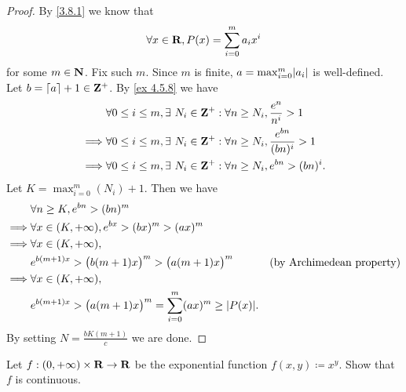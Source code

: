 \begin{proof}
  By \cref{3.8.1} we know that
  \[
    \forall x \in \mathbf{R}, P(x) = \sum_{i = 0}^m a_i x^i
  \]
  for some \(m \in \mathbf{N}\).
  Fix such \(m\).
  Since \(m\) is finite, \(a = \max_{i = 0}^m \abs{a_i}\) is well-defined.
  Let \(b = \left\lceil a\right\rceil + 1 \in \mathbf{Z}^+\).
  By \cref{ex 4.5.8} we have
  \begin{align*}
             & \forall 0 \leq i \leq m, \exists\ N_i \in \mathbf{Z}^+ : \forall n \geq N_i, \frac{e^n}{n^i} > 1       \\
    \implies & \forall 0 \leq i \leq m, \exists\ N_i \in \mathbf{Z}^+ : \forall n \geq N_i, \frac{e^{bn}}{(bn)^i} > 1 \\
    \implies & \forall 0 \leq i \leq m, \exists\ N_i \in \mathbf{Z}^+ : \forall n \geq N_i, e^{bn} > (bn)^i.
  \end{align*}
  Let \(K = \max_{i = 0}^m(N_i) + 1\).
  Then we have
  \begin{align*}
             & \forall n \geq K, e^{bn} > (bn)^m                                                                                     \\
    \implies & \forall x \in (K, +\infty), e^{bx} > (bx)^m > (ax)^m                                                                  \\
    \implies & \forall x \in (K, +\infty),                                                                                           \\
             & e^{b (m + 1) x} > \big(b (m + 1) x\big)^m > \big(a (m + 1) x\big)^m                & \text{(by Archimedean property)} \\
    \implies & \forall x \in (K, +\infty),                                                                                           \\
             & e^{b (m + 1) x} > \big(a (m + 1) x\big)^m = \sum_{i = 0}^m (ax)^m \geq \abs{P(x)}.
  \end{align*}
  By setting \(N = \frac{b K (m + 1)}{c}\) we are done.
\end{proof}

\begin{exercise}\label{ex 4.5.10}
  Let \(f : (0, +\infty) \times \mathbf{R} \to \mathbf{R}\) be the exponential function \(f(x, y) \coloneqq x^y\).
  Show that \(f\) is continuous.
\end{exercise}

